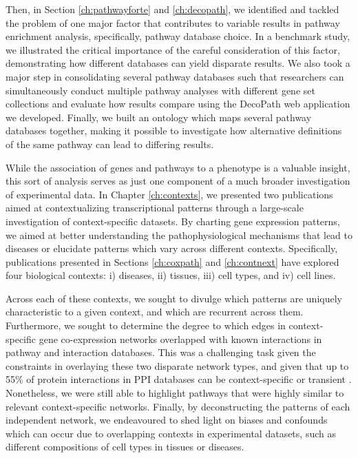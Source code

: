 Then, in Section \ref{ch:pathwayforte} and \ref{ch:decopath}, we identified and tackled the problem of one major factor that contributes to variable results in pathway enrichment analysis, specifically, pathway database choice. In a benchmark study, we illustrated the critical importance of the careful consideration of this factor, demonstrating how different databases can yield disparate results. We also took a major step in consolidating several pathway databases such that researchers can simultaneously conduct multiple pathway analyses with different gene set collections and evaluate how results compare using the DecoPath web application we developed. Finally, we built an ontology which maps several pathway databases together, making it possible to investigate how alternative definitions of the same pathway can lead to differing results. 

While the association of genes and pathways to a phenotype is a valuable insight, this sort of analysis serves as just one component of a much broader investigation of experimental data. In Chapter \ref{ch:contexts}, we presented two publications aimed at contextualizing transcriptional patterns through a large-scale investigation of context-specific datasets. By charting gene expression patterns, we aimed at better understanding the pathophysiological mechanisms that lead to diseases or elucidate patterns which vary across different contexts. Specifically, publications presented in Sections \ref{ch:coxpath} and \ref{ch:contnext} have explored four biological contexts: i) diseases, ii) tissues, iii) cell types, and iv) cell lines. 

Across each of these contexts, we sought to divulge which patterns are uniquely characteristic to a given context, and which are recurrent across them. Furthermore, we sought to determine the degree to which edges in context-specific gene co-expression networks overlapped with known interactions in pathway and interaction databases. This was a challenging task given the constraints in overlaying these two disparate network types, and given that up to 55\% of protein interactions in PPI databases can be context-specific or transient \parencite{stacey2018}. Nonetheless, we were still able to highlight pathways that were highly similar to relevant context-specific networks. Finally, by deconstructing the patterns of each independent network, we endeavoured to shed light on biases and confounds which can occur due to overlapping contexts in experimental datasets, such as different compositions of cell types in tissues or diseases. 

